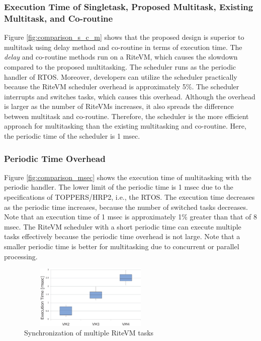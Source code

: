\documentclass[conference]{IEEEtran/IEEEtran/IEEEtran}
\begin{document}
\subsubsection{Execution Time of Singletask, Proposed Multitask, Existing Multitask, and Co-routine}
Figure \ref{fig:comparison_s_c_m} shows that the proposed design is superior to multitask using delay method and co-routine in terms of execution time.
The {\it delay} and co-routine methods run on a RiteVM, which causes the slowdown compared to the proposed multitasking.
The scheduler runs as the periodic handler of RTOS.
Moreover, developers can utilize the scheduler practically because the RiteVM scheduler overhead is approximately 5\%.
The scheduler interrupts and switches tasks, which causes this overhead.
Although the overhead is larger as the number of RiteVMs increases, it also spreads the difference between multitask and co-routine.
Therefore, the scheduler is the more efficient approach for multitasking than the existing multitasking and co-routine.
Here, the periodic time of the scheduler is 1 msec.

\subsubsection{Periodic Time Overhead}
Figure \ref{fig:comparison_msec} shows the execution time of multitasking with the periodic handler.
The lower limit of the periodic time is 1 msec due to the specifications of TOPPERS/HRP2, i.e., the RTOS.
The execution time decreases as the periodic time increases, because the number of switched tasks decreases.
Note that an execution time of 1 msec is approximately 1\% greater than that of 8 msec.
The RiteVM scheduler with a short periodic time can execute multiple tasks effectively because the periodic time overhead is not large.
Note that a smaller periodic time is better for multitasking due to concurrent or parallel processing.

 \begin{figure}[t]
    \centering
    \includegraphics[height=3.0cm,width=7.0cm,clip]{figure/eval_synchronization.eps}
    \vspace{-3mm}
\caption{Synchronization of multiple RiteVM tasks}
    \vspace{-3mm}
\label{fig:eval_synchronization}
\end{figure}
\end{document}
